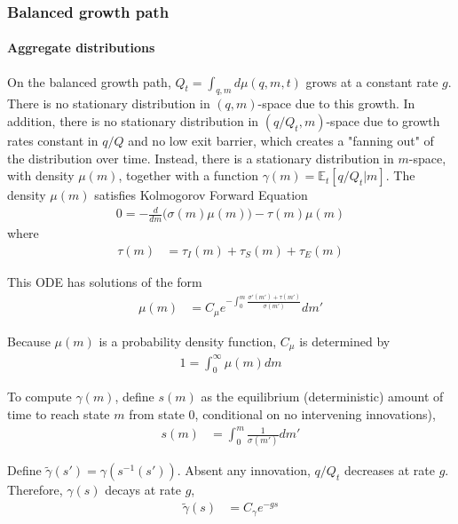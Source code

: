 \documentclass[12pt,english]{article}
\theoremstyle{remark}
\begin{document}
\subsubsection{Balanced growth path}\label{bgp}

\paragraph{Aggregate distributions} 

On the balanced growth path, $Q_t = \int_{q,m} d\mu(q,m,t)$ grows at a constant rate $g$. There is no stationary distribution in $(q,m)$-space due to this growth. In addition, there is no stationary distribution in $(q/Q_t,m)$-space due to growth rates constant in $q/Q$ and no low exit barrier, which creates a "fanning out" of the distribution over time. Instead, there is a stationary distribution in $m$-space, with density $\mu(m)$, together with a function $\gamma(m) = \mathbb{E}_t[q/Q_t|m]$. The density $\mu(m)$ satisfies Kolmogorov Forward Equation
\begin{align}
0 = - \frac{d}{dm} \Big( \sigma(m) \mu(m) \Big) - \tau(m) \mu(m)  \label{KF_equation}
\end{align}
where
\begin{align}
\tau(m) &= \tau_I(m) + \tau_S(m) + \tau_E(m) 
\end{align}

This ODE has solutions of the form
\begin{align}
\mu(m) &= C_\mu e^{-\int_0^m \frac{\sigma'(m') + \tau(m')}{\sigma(m')}} dm' \label{KF_solution_1}
\end{align}

Because $\mu(m)$ is a probability density function, $C_\mu$ is determined by
\begin{align}
1 = \int_0^{\infty} \mu(m) dm \label{KF_solution_2}
\end{align}

To compute $\gamma(m)$, define $s(m)$ as the equilibrium (deterministic) amount of time to reach state $m$ from state $0$, conditional on no intervening innovations), 
\begin{align}
s(m) &= \int_0^m \frac{1}{\sigma(m')} dm'
\end{align}

Define $\tilde{\gamma}(s') = \gamma(s^{-1}(s'))$. Absent any innovation, $q/Q_t$ decreases at rate $g$. Therefore, $\gamma(s)$ decays at rate $g$, 
\begin{align}
\tilde{\gamma}(s) &= C_{\gamma} e^{-gs}
\end{align}
\end{document}
